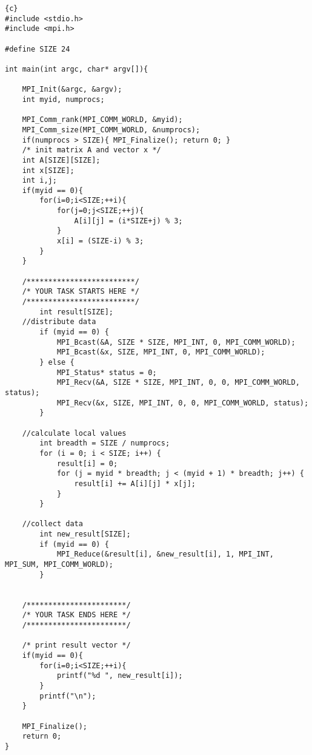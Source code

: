 \documentclass[10pt,a4paper]{scrartcl}
\begin{document}
\begin{lstlisting}{c}
#include <stdio.h>
#include <mpi.h>

#define SIZE 24

int main(int argc, char* argv[]){

    MPI_Init(&argc, &argv);
    int myid, numprocs;

    MPI_Comm_rank(MPI_COMM_WORLD, &myid);
    MPI_Comm_size(MPI_COMM_WORLD, &numprocs);
    if(numprocs > SIZE){ MPI_Finalize(); return 0; }
    /* init matrix A and vector x */
    int A[SIZE][SIZE];
    int x[SIZE];
    int i,j;
    if(myid == 0){
        for(i=0;i<SIZE;++i){
            for(j=0;j<SIZE;++j){
                A[i][j] = (i*SIZE+j) % 3;
            }
            x[i] = (SIZE-i) % 3;
        }
    }

    /*************************/
    /* YOUR TASK STARTS HERE */
    /*************************/
        int result[SIZE];
    //distribute data
        if (myid == 0) {
            MPI_Bcast(&A, SIZE * SIZE, MPI_INT, 0, MPI_COMM_WORLD);
            MPI_Bcast(&x, SIZE, MPI_INT, 0, MPI_COMM_WORLD);
        } else {
            MPI_Status* status = 0;
            MPI_Recv(&A, SIZE * SIZE, MPI_INT, 0, 0, MPI_COMM_WORLD, status);
            MPI_Recv(&x, SIZE, MPI_INT, 0, 0, MPI_COMM_WORLD, status);
        }

    //calculate local values
        int breadth = SIZE / numprocs;
        for (i = 0; i < SIZE; i++) {
            result[i] = 0;
            for (j = myid * breadth; j < (myid + 1) * breadth; j++) {
                result[i] += A[i][j] * x[j];
            }
        }

    //collect data
        int new_result[SIZE];
        if (myid == 0) {
            MPI_Reduce(&result[i], &new_result[i], 1, MPI_INT, MPI_SUM, MPI_COMM_WORLD);
        }


    /***********************/
    /* YOUR TASK ENDS HERE */
    /***********************/

    /* print result vector */
    if(myid == 0){
        for(i=0;i<SIZE;++i){
            printf("%d ", new_result[i]);
        }
        printf("\n");
    }

    MPI_Finalize();
    return 0;
}

\end{lstlisting}
\end{document}
